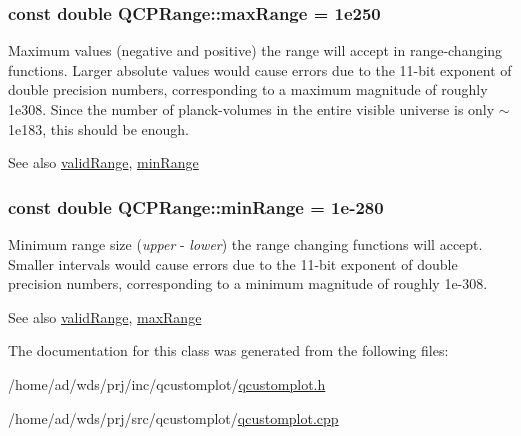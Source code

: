 \subsubsection[{\texorpdfstring{max\+Range}{maxRange}}]{\setlength{\rightskip}{0pt plus 5cm}const double Q\+C\+P\+Range\+::max\+Range = 1e250\hspace{0.3cm}{\ttfamily [static]}}\hypertarget{class_q_c_p_range_a5ca51e7a2dc5dc0d49527ab171fe1f4f}{}\label{class_q_c_p_range_a5ca51e7a2dc5dc0d49527ab171fe1f4f}
Maximum values (negative and positive) the range will accept in range-\/changing functions. Larger absolute values would cause errors due to the 11-\/bit exponent of double precision numbers, corresponding to a maximum magnitude of roughly 1e308. Since the number of planck-\/volumes in the entire visible universe is only $\sim$1e183, this should be enough. \begin{DoxySeeAlso}{See also}
\hyperlink{class_q_c_p_range_ab38bd4841c77c7bb86c9eea0f142dcc0}{valid\+Range}, \hyperlink{class_q_c_p_range_ab46d3bc95030ee25efda41b89e2b616b}{min\+Range} 
\end{DoxySeeAlso}
\subsubsection[{\texorpdfstring{min\+Range}{minRange}}]{\setlength{\rightskip}{0pt plus 5cm}const double Q\+C\+P\+Range\+::min\+Range = 1e-\/280\hspace{0.3cm}{\ttfamily [static]}}\hypertarget{class_q_c_p_range_ab46d3bc95030ee25efda41b89e2b616b}{}\label{class_q_c_p_range_ab46d3bc95030ee25efda41b89e2b616b}
Minimum range size ({\itshape upper} -\/ {\itshape lower}) the range changing functions will accept. Smaller intervals would cause errors due to the 11-\/bit exponent of double precision numbers, corresponding to a minimum magnitude of roughly 1e-\/308. \begin{DoxySeeAlso}{See also}
\hyperlink{class_q_c_p_range_ab38bd4841c77c7bb86c9eea0f142dcc0}{valid\+Range}, \hyperlink{class_q_c_p_range_a5ca51e7a2dc5dc0d49527ab171fe1f4f}{max\+Range} 
\end{DoxySeeAlso}


The documentation for this class was generated from the following files\+:\begin{DoxyCompactItemize}
\item 
/home/ad/wds/prj/inc/qcustomplot/\hyperlink{qcustomplot_8h}{qcustomplot.\+h}\item 
/home/ad/wds/prj/src/qcustomplot/\hyperlink{qcustomplot_8cpp}{qcustomplot.\+cpp}\end{DoxyCompactItemize}
